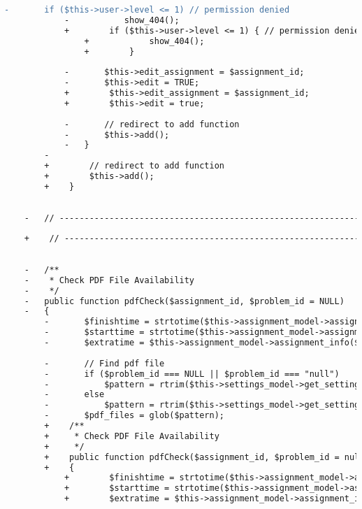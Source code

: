 \begin{lstlisting}[language=diff, caption=Perubahan pada kode Assignments.php]
			-		if ($this->user->level <= 1) // permission denied
			-			show_404();
			+        if ($this->user->level <= 1) { // permission denied
				+            show_404();
				+        }
			
			-		$this->edit_assignment = $assignment_id;
			-		$this->edit = TRUE;
			+        $this->edit_assignment = $assignment_id;
			+        $this->edit = true;
			
			-		// redirect to add function
			-		$this->add();
			-	}
		-	
		+        // redirect to add function
		+        $this->add();
		+    }
	
	
	-	// ------------------------------------------------------------------------
	
	+    // ------------------------------------------------------------------------
	
	
	-	/**
	-	 * Check PDF File Availability
	-	 */
	-	public function pdfCheck($assignment_id, $problem_id = NULL)
	-	{
		-		$finishtime = strtotime($this->assignment_model->assignment_info($assignment_id)['finish_time']);
		-		$starttime = strtotime($this->assignment_model->assignment_info($assignment_id)['start_time']);
		-		$extratime = $this->assignment_model->assignment_info($assignment_id)['extra_time'];
		
		-		// Find pdf file
		-		if ($problem_id === NULL || $problem_id === "null")
		-			$pattern = rtrim($this->settings_model->get_setting('assignments_root'),'/')."/assignment_{$assignment_id}/*.pdf";
		-		else
		-			$pattern = rtrim($this->settings_model->get_setting('assignments_root'),'/')."/assignment_{$assignment_id}/p{$problem_id}/*.pdf";
		-		$pdf_files = glob($pattern);
		+    /**
		+     * Check PDF File Availability
		+     */
		+    public function pdfCheck($assignment_id, $problem_id = null)
		+    {
			+        $finishtime = strtotime($this->assignment_model->assignment_info($assignment_id)['finish_time']);
			+        $starttime = strtotime($this->assignment_model->assignment_info($assignment_id)['start_time']);
			+        $extratime = $this->assignment_model->assignment_info($assignment_id)['extra_time'];
			

\end{lstlisting}
